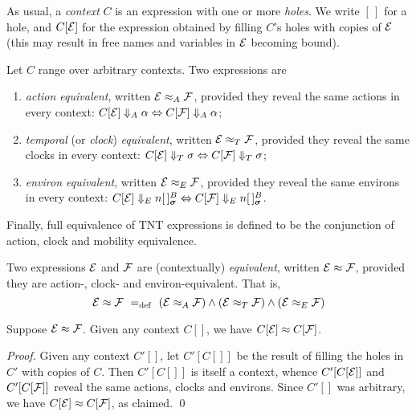 \documentclass[orivec,envcountsame]{llncs}
\newcommand{\Reveals}[1]{\mathrel{\Downarrow_{#1}}}
\newcommand{\RevealsA}{\Reveals{A}}
\newcommand{\RevealsC}{\Reveals{T}}
\newcommand{\RevealsE}{\Reveals{E}}
\newcommand{\Eq}{\approx}
\newcommand{\EqA}{\mathrel{\Eq_{A}}}
\newcommand{\EqC}{\mathrel{\Eq_{T}}}
\newcommand{\EqE}{\mathrel{\Eq_{E}}}
\newcommand{\Means}{\mathrel{~=_{\mathrm{def}}~}}
\begin{document}
As usual, a \emph{context} $C$ is an expression with one or more
\emph{holes}. We write $[\,]$ for a hole, and $C[\text{$\mathcal{E}$}]$ for the expression
obtained by filling $C$'s holes with copies of $\text{$\mathcal{E}$}$ (this may result
in free names and variables in $\text{$\mathcal{E}$}$ becoming bound).

\begin{definition}
Let $C$ range over arbitrary contexts. Two expressions are
\begin{enumerate}
\item
    \emph{action equivalent}, written $\expr \EqA \exprb$, provided they
     reveal the same actions in every context: $C[\expr] \RevealsA
     \alpha \Leftrightarrow C[\exprb] \RevealsA \alpha$;
\item
    \emph{temporal} (or \emph{clock}) \emph{equivalent}, written $\expr \EqC
    \exprb$, provided they reveal the same clocks in every context: $C[\expr] 
    \RevealsC \sigma \Leftrightarrow C[\exprb] \RevealsC \sigma$;
\item
    \emph{environ equivalent}, written $\expr \EqE \exprb$, provided
     they reveal the same environs in every context: $C[\expr] \RevealsE
     \locv{n}{\,}{B}{\vec{\sigma}} \Leftrightarrow C[\exprb] \RevealsE \locv{n}{\,}{B}{\vec{\sigma}}$.
\end{enumerate}
\end{definition}

Finally, full equivalence of TNT expressions is defined to be the
conjunction of action, clock and mobility equivalence.
\begin{definition}
Two expressions $\text{$\mathcal{E}$}$ and $\text{$\mathcal{F}$}$ are (contextually)
\emph{equivalent}, written $\expr \Eq \exprb$, provided they are
action-, clock- and environ-equivalent. That is,
\[
    \expr \Eq \exprb
    \Means
    \left( \expr \EqA \exprb \right)
    \land
    \left( \expr \EqC \exprb \right)
    \land 
    \left( \expr \EqE \exprb \right)
\]
\end{definition}


\begin{proposition}
\label{prop:context-substitution} 
Suppose $\expr \Eq \exprb$. Given any context $C[]$, we have $C[\expr]
\Eq C[\exprb]$.
\end{proposition}
\begin{proof}
Given any context $C'[]$, let $C'[C[]]$ be the result of filling the
holes in $C'$ with copies of $C$. Then $C'[C[]]$ is itself a context,
whence $C'[C[\text{$\mathcal{E}$}]]$ and $C'[C[\text{$\mathcal{F}$}]]$ reveal the same actions,
clocks and environs. Since $C'[]$ was arbitrary, we have $C[\expr] \Eq
C[\exprb]$, as claimed.
\qed \end{proof}
\end{document}
